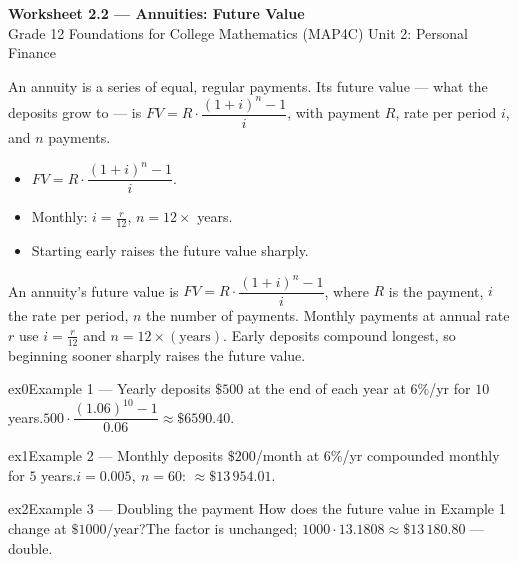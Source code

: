 \documentclass[11pt]{article}
\begin{document}
\begin{center}
{\LARGE\bfseries\color{titleblue}Worksheet 2.2 --- Annuities: Future Value}\\[2pt]
{\small Grade 12 Foundations for College Mathematics (MAP4C) \textperiodcentered{} Unit 2: Personal Finance}
\end{center}

\begin{ideabox}
An annuity is a series of equal, regular payments. Its future value — what the deposits grow to — is $FV=R\cdot\dfrac{(1+i)^{n}-1}{i}$, with payment $R$, rate per period $i$, and $n$ payments.
\begin{itemize}[leftmargin=*,itemsep=2pt]
  \item $FV=R\cdot\dfrac{(1+i)^{n}-1}{i}$.
  \item Monthly: $i=\tfrac{r}{12}$, $n=12\times$ years.
  \item Starting early raises the future value sharply.
\end{itemize}
\end{ideabox}

\begin{learnbox}
An annuity's future value is $FV=R\cdot\dfrac{(1+i)^{n}-1}{i}$, where $R$ is the payment, $i$ the rate per period, $n$ the number of payments.
Monthly payments at annual rate $r$ use $i=\tfrac{r}{12}$ and $n=12\times(\text{years})$.
Early deposits compound longest, so beginning sooner sharply raises the future value.
\end{learnbox}


\begin{example}{ex0}{Example 1 --- Yearly deposits}
$\$500$ at the end of each year at $6\%$/yr for $10$ years.\soln $500\cdot\dfrac{(1.06)^{10}-1}{0.06}\approx\$6590.40$.
\end{example}

\begin{example}{ex1}{Example 2 --- Monthly deposits}
$\$200$/month at $6\%$/yr compounded monthly for $5$ years.\soln $i=0.005,\ n=60$: $\approx\$13\,954.01$.
\end{example}

\begin{example}{ex2}{Example 3 --- Doubling the payment}
How does the future value in Example 1 change at $\$1000$/year?\soln The factor is unchanged; $1000\cdot13.1808\approx\$13\,180.80$ — double.
\end{example}
\end{document}
